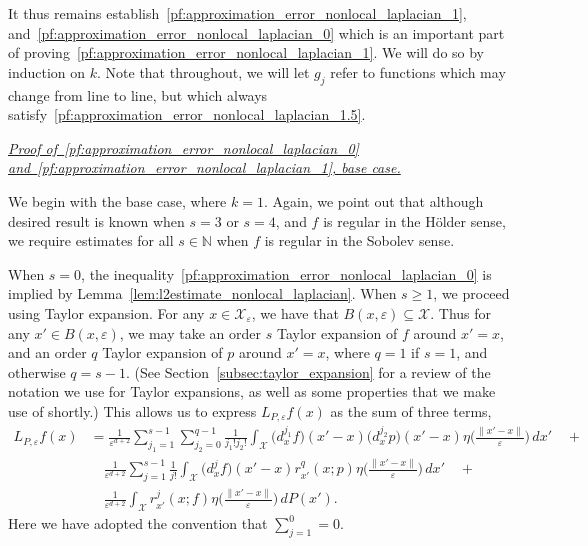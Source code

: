 \documentclass[aos]{imsart}
\theoremstyle{plain}
\theoremstyle{definition}
\theoremstyle{remark}
\newcommand{\mc}[1]{\mathcal{#1}}
\newcommand{\1}{\mathbf{1}}
\begin{document}
It thus remains establish~\eqref{pf:approximation_error_nonlocal_laplacian_1}, and~\eqref{pf:approximation_error_nonlocal_laplacian_0} which is an important part of proving~\eqref{pf:approximation_error_nonlocal_laplacian_1}. We will do so by induction on $k$. Note that throughout, we will let $g_j$ refer to functions which may change from line to line, but which always satisfy~\eqref{pf:approximation_error_nonlocal_laplacian_1.5}. 

\underline{\textit{Proof of~\eqref{pf:approximation_error_nonlocal_laplacian_0} and~\eqref{pf:approximation_error_nonlocal_laplacian_1}, base case.}}

We begin with the base case, where $k = 1$. Again, we point out that although desired result is known when $s = 3$ or $s = 4$, and $f$ is regular in the H\"{o}lder sense, we require estimates for all $s \in \mathbb{N}$ when $f$ is regular in the Sobolev sense.

When $s = 0$, the inequality~\eqref{pf:approximation_error_nonlocal_laplacian_0} is implied by Lemma~\ref{lem:l2estimate_nonlocal_laplacian}.  When $s \geq 1$, we proceed using Taylor expansion. For any $x \in \mc{X}_{\varepsilon}$, we have that $B(x,\varepsilon) \subseteq \mc{X}$. Thus for any $x' \in B(x,\varepsilon)$, we may take an order $s$ Taylor expansion of $f$ around $x' = x$, and an order $q$ Taylor expansion of $p$ around $x' = x$, where $q = 1$ if $s = 1$, and otherwise $q = s - 1$. (See Section~\ref{subsec:taylor_expansion} for a review of the notation we use for Taylor expansions, as well as some properties that we make use of shortly.) This allows us to express $L_{P,\varepsilon}f(x)$ as the sum of three terms,
\begin{align*}
L_{P,\varepsilon}f(x) & = \frac{1}{\varepsilon^{d + 2}}\sum_{j_1 = 1}^{s - 1} \sum_{j_2 = 0}^{q - 1}\frac{1}{j_1!j_2!}  \int_{\mc{X}} \bigl(d_x^{j_1}f\bigr)(x' - x) \bigl(d_x^{j_2}p\bigr)(x' - x) \eta\biggl(\frac{\|x' - x\|}{\varepsilon}\biggr) \,dx' \quad + \\
& \quad \frac{1}{\varepsilon^{d + 2}}\sum_{j = 1}^{s - 1} \frac{1}{j!} \int_{\mc{X}} \bigl(d_x^jf\bigr)(x' - x)  r_{x'}^{q}(x;p) \eta\biggl(\frac{\|x' - x\|}{\varepsilon}\biggr) \,dx' \quad  + \\
& \quad \frac{1}{\varepsilon^{d + 2}} \int_{\mc{X}} r_{x'}^j(x;f) \eta\biggl(\frac{\|x' - x\|}{\varepsilon}\biggr) \,dP(x').
\end{align*}
Here we have adopted the convention that $\sum_{j = 1}^{0} = 0$. 
\end{document}
